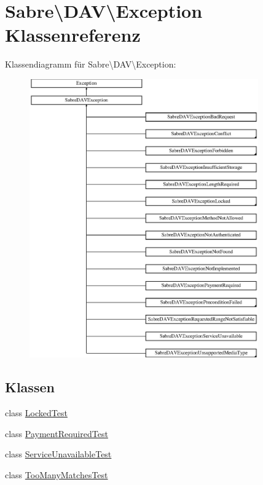 \hypertarget{class_sabre_1_1_d_a_v_1_1_exception}{}\section{Sabre\textbackslash{}D\+AV\textbackslash{}Exception Klassenreferenz}
\label{class_sabre_1_1_d_a_v_1_1_exception}
Klassendiagramm für Sabre\textbackslash{}D\+AV\textbackslash{}Exception\+:\begin{figure}[H]
\begin{center}
\leavevmode
\includegraphics[height=12.000000cm]{class_sabre_1_1_d_a_v_1_1_exception}
\end{center}
\end{figure}
\subsection*{Klassen}
\begin{DoxyCompactItemize}
\item 
class \mbox{\hyperlink{class_sabre_1_1_d_a_v_1_1_exception_1_1_locked_test}{Locked\+Test}}
\item 
class \mbox{\hyperlink{class_sabre_1_1_d_a_v_1_1_exception_1_1_payment_required_test}{Payment\+Required\+Test}}
\item 
class \mbox{\hyperlink{class_sabre_1_1_d_a_v_1_1_exception_1_1_service_unavailable_test}{Service\+Unavailable\+Test}}
\item 
class \mbox{\hyperlink{class_sabre_1_1_d_a_v_1_1_exception_1_1_too_many_matches_test}{Too\+Many\+Matches\+Test}}
\end{DoxyCompactItemize}
